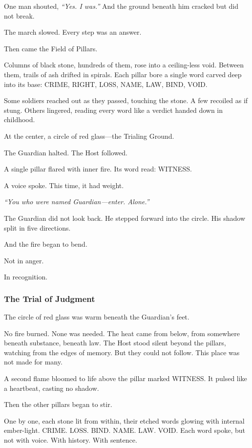 \documentclass[12pt]{article}
\begin{document}
One man shouted, \textit{``Yes. I was.''} And the ground beneath him cracked but did not break.

The march slowed. Every step was an answer.

Then came the Field of Pillars.

Columns of black stone, hundreds of them, rose into a ceiling-less void. Between them, trails of ash drifted in spirals. Each pillar bore a single word carved deep into its base: \textsc{CRIME}, \textsc{RIGHT}, \textsc{LOSS}, \textsc{NAME}, \textsc{LAW}, \textsc{BIND}, \textsc{VOID}.

Some soldiers reached out as they passed, touching the stone. A few recoiled as if stung. Others lingered, reading every word like a verdict handed down in childhood.

At the center, a circle of red glass—the Trialing Ground.

The Guardian halted. The Host followed.

A single pillar flared with inner fire. Its word read: \textsc{WITNESS}.

A voice spoke. This time, it had weight.

\textit{``You who were named Guardian—enter. Alone.''}

The Guardian did not look back. He stepped forward into the circle. His shadow split in five directions.

And the fire began to bend.

Not in anger.

In recognition.

\dotfill

\subsubsection{The Trial of Judgment}

The circle of red glass was warm beneath the Guardian's feet.

No fire burned. None was needed. The heat came from below, from somewhere beneath substance, beneath law. The Host stood silent beyond the pillars, watching from the edges of memory. But they could not follow. This place was not made for many.

A second flame bloomed to life above the pillar marked \textsc{WITNESS}. It pulsed like a heartbeat, casting no shadow.

Then the other pillars began to stir.

One by one, each stone lit from within, their etched words glowing with internal ember-light. \textsc{CRIME}. \textsc{LOSS}. \textsc{BIND}. \textsc{NAME}. \textsc{LAW}. \textsc{VOID}. Each word spoke, but not with voice. With history. With sentence.
\end{document}
